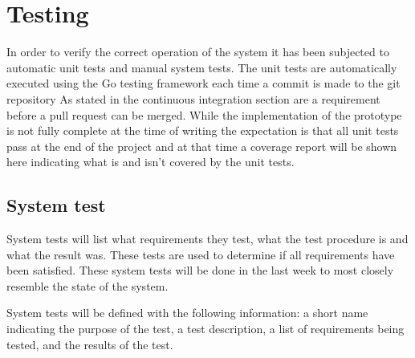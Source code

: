 %

\chapter{Testing}
In order to verify the correct operation of the system it has been subjected to automatic unit tests and manual system tests.
The unit tests are automatically executed using the Go testing framework each time a commit is made to the git repository
As stated in the continuous integration section are a requirement before a pull request can be merged.
While the implementation of the prototype is not fully complete at the time of writing the expectation is that all unit tests pass at the end of the project and at that time a coverage report will be shown here indicating what is and isn't covered by the unit tests.

\section{System test}
System tests will list what requirements they test, what the test procedure is and what the result was.
These tests are used to determine if all requirements have been satisfied.
These system tests will be done in the last week to most closely resemble the state of the system.

System tests will be defined with the following information: a short name indicating the purpose of the test, a test description, a list of requirements being tested, and the results of the test.
